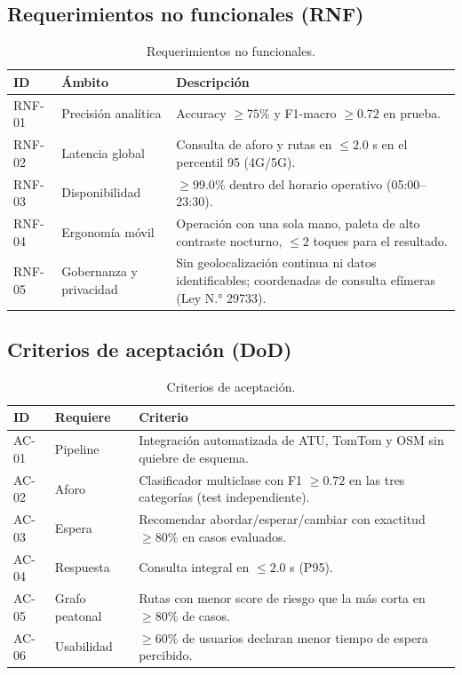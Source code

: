 \documentclass[11pt]{article}
\begin{document}
\subsection{Requerimientos no funcionales (RNF)}
\begin{table}[H]
\centering
\caption{Requerimientos no funcionales.}
\label{tab:rnf}
\begin{tabularx}{\textwidth}{ll>{\raggedright\arraybackslash}X}
\toprule
\textbf{ID} & \textbf{Ámbito} & \textbf{Descripción} \\
\midrule
RNF-01 & Precisión analítica & Accuracy $\geq 75\%$ y F1-macro $\geq 0.72$ en prueba. \\
RNF-02 & Latencia global & Consulta de aforo y rutas en $\leq 2.0$ s en el percentil 95 (4G/5G). \\
RNF-03 & Disponibilidad & $\geq 99.0\%$ dentro del horario operativo (05:00--23:30). \\
RNF-04 & Ergonomía móvil & Operación con una sola mano, paleta de alto contraste nocturno, $\leq 2$ toques para el resultado. \\
RNF-05 & Gobernanza y privacidad & Sin geolocalización continua ni datos identificables; coordenadas de consulta efímeras (Ley N.° 29733). \\
\bottomrule
\end{tabularx}
\end{table}

\subsection{Criterios de aceptación (DoD)}
\begin{table}[H]
\centering
\caption{Criterios de aceptación.}
\label{tab:ac}
\begin{tabularx}{\textwidth}{ll>{\raggedright\arraybackslash}X}
\toprule
\textbf{ID} & \textbf{Requiere} & \textbf{Criterio} \\
\midrule
AC-01 & Pipeline & Integración automatizada de ATU, TomTom y OSM sin quiebre de esquema. \\
AC-02 & Aforo & Clasificador multiclase con F1 $\geq 0.72$ en las tres categorías (test independiente). \\
AC-03 & Espera & Recomendar abordar/esperar/cambiar con exactitud $\geq 80\%$ en casos evaluados. \\
AC-04 & Respuesta & Consulta integral en $\leq 2.0$ s (P95). \\
AC-05 & Grafo peatonal & Rutas con menor score de riesgo que la más corta en $\geq 80\%$ de casos. \\
AC-06 & Usabilidad & $\geq 60\%$ de usuarios declaran menor tiempo de espera percibido. \\
\bottomrule
\end{tabularx}
\end{table}
\end{document}
